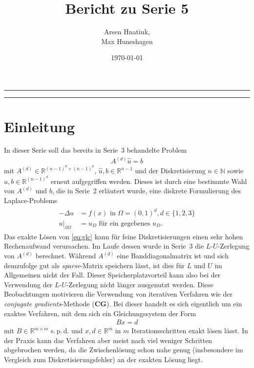 \documentclass[smallheadings]{scrartcl}
\title{Bericht zu Serie 5}
\author{%
  Arsen Hnatiuk,\\%
  Max Huneshagen 
}
\date{\today}
\numberwithin{equation}{section}
\begin{document}
\maketitle
\tableofcontents
\bigskip

\hrule
\hrule


\section{Einleitung}

In dieser Serie soll das bereits in Serie~3 behandelte Problem 
\begin{align}
A^{(d)}\hat{u} = b
\label{eq:glc}
\end{align}
mit $A^{(d)}\in\mathbb{R}^{(n-1)^d\times(n-1)^d}$, $\hat{u},b\in\mathbb{R}^{n-1}$ und der Diskretisierung $n\in\mathbb{N}$ sowie $\hat{u},b \in \mathbb{R}^{(n-1)^d}$ erneut aufgegriffen werden. Dieses ist durch eine bestimmte Wahl von $A^{(d)}$ und $b$, die in Serie~2 erläutert wurde,  eine diskrete Formulierung des Laplace-Problems 
\begin{align}
\begin{split}
-\Delta u&=f(x)\text{ in }\Omega=(0, 1)^d, d\in\{1,2,3\}\\
u \vert _{\partial\Omega}&=u_D\text{ für ein gegebenes }u_D.
\end{split}
\label{eq:rwp}
\end{align}
Das exakte Lösen von \eqref{eq:glc} kann für feine Diskretisierungen einen sehr hohen Rechenaufwand verursachen. Im Laufe dessen wurde in Serie~3 die  $L$-$U$-Zerlegung von $A^{(d)}$ berechnet. Während $A^{(d)}$ eine Banddiagonalmatrix ist und sich demzufolge gut als \textit{sparse}-Matrix speichern lässt, ist dies für $L$ und $U$ im Allgemeinen nicht der Fall. Dieser Speicherplatzvorteil kann also bei der Verwendung der $L$-$U$-Zerlegung nicht länger ausgenutzt werden. Diese Beobachtungen motivieren die Verwendung von iterativen Verfahren wie der \emph{conjugate gradients}-Methode (\textbf{CG}). Bei dieser handelt es sich eigentlich um ein exaktes Verfahren, mit dem sich ein Gleichungssystem der Form
\begin{align}
Bx=d
\end{align}
mit $B \in \mathbb{R}^{m\times m}$ s.\,p.\,d. und $x,d\in \mathbb{R}^m$ in $m$ Iterationsschritten exakt lösen lässt. In der Praxis kann das Verfahren aber meist nach viel weniger Schritten abgebrochen werden, da die Zwischenlösung schon nahe genug (insbesondere im Vergleich zum Diskretisierungsfehler) an der exakten Lösung liegt.
\end{document}

